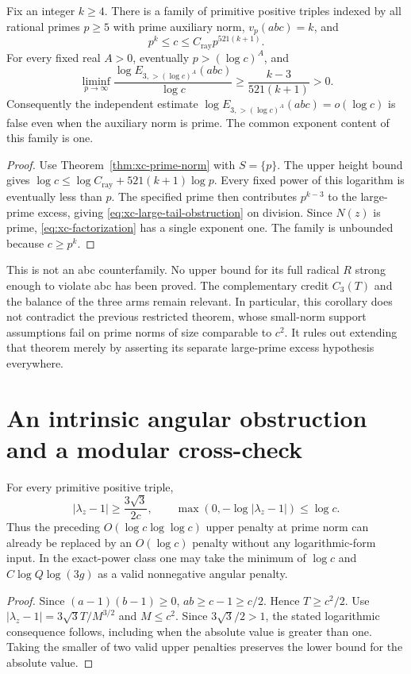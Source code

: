\begin{corollary}
\label{cor:xc-overlap}
Fix an integer $k\ge4$. There is a family of primitive positive triples
indexed by all rational primes $p\ge5$ with prime auxiliary norm,
$v_p(abc)=k$, and
\[
 p^k\le c\le C_{\mathrm{ray}}p^{521(k+1)}.
\]
For every fixed real $A>0$, eventually $p>(\log c)^A$, and
\begin{equation}\label{eq:xc-large-tail-obstruction}
 \liminf_{p\to\infty}
 \frac{\log E_{3,>(\log c)^A}(abc)}{\log c}
 \ge\frac{k-3}{521(k+1)}>0.
\end{equation}
Consequently the independent estimate
$\log E_{3,>(\log c)^A}(abc)=o(\log c)$ is false even when the auxiliary
norm is prime. The common exponent content of this family is one.
\end{corollary}
\begin{proof}
Use Theorem~\ref{thm:xc-prime-norm} with $S=\{p\}$.
The upper height bound gives $\log c\le\log C_{\mathrm{ray}}+521(k+1)\log p$.
Every fixed power of this logarithm is eventually less than $p$.
The specified prime then contributes $p^{k-3}$ to the large-prime excess,
giving \eqref{eq:xc-large-tail-obstruction} on division.
Since $N(z)$ is prime, \eqref{eq:xc-factorization} has a single exponent one.
The family is unbounded because $c\ge p^k$.
\end{proof}

This is not an abc counterfamily. No upper bound for its full radical $R$
strong enough to violate abc has been proved. The complementary credit
$C_3(T)$ and the balance of the three arms remain relevant. In particular,
this corollary does not contradict the previous restricted theorem, whose
small-norm support assumptions fail on prime norms of size comparable to
$c^2$. It rules out extending that theorem merely by asserting its separate
large-prime excess hypothesis everywhere.

\section{An intrinsic angular obstruction and a modular cross-check}
\label{sec:xc-audit}
\begin{proposition}
\label{prop:xc-angular-cap}
For every primitive positive triple,
\[
 |\lambda_z-1|\ge\frac{3\sqrt3}{2c},\qquad
 \max(0,-\log|\lambda_z-1|)\le\log c.
\]
Thus the preceding $O(\log c\log\log c)$ upper penalty at prime norm can
already be replaced by an $O(\log c)$ penalty without any logarithmic-form
input. In the exact-power class one may take the minimum of $\log c$ and
$C\log Q\log(3g)$ as a valid nonnegative angular penalty.
\end{proposition}
\begin{proof}
Since $(a-1)(b-1)\ge0$, $ab\ge c-1\ge c/2$. Hence $T\ge c^2/2$.
Use $|\lambda_z-1|=3\sqrt3T/M^{3/2}$ and $M\le c^2$. Since
$3\sqrt3/2>1$, the stated logarithmic consequence follows, including when
the absolute value is greater than one. Taking the smaller of two valid
upper penalties preserves the lower bound for the absolute value.
\end{proof}

